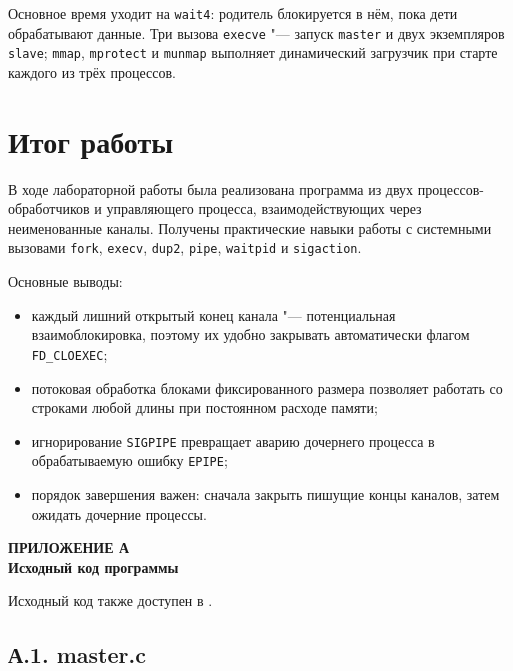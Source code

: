 \documentclass[12pt,a4paper]{article}
\begin{document}
Основное время уходит на \texttt{wait4}: родитель блокируется в нём, пока дети
обрабатывают данные. Три вызова \texttt{execve} "--- запуск \texttt{master} и
двух экземпляров \texttt{slave}; \texttt{mmap}, \texttt{mprotect} и
\texttt{munmap} выполняет динамический загрузчик при старте каждого из трёх
процессов.

\section{Итог работы}
В ходе лабораторной работы была реализована программа из двух
процессов-обработчиков и управляющего процесса, взаимодействующих через
неименованные каналы. Получены практические навыки работы с системными вызовами
\texttt{fork}, \texttt{execv}, \texttt{dup2}, \texttt{pipe}, \texttt{waitpid}
и \texttt{sigaction}.

Основные выводы:
\begin{itemize}
    \item каждый лишний открытый конец канала "--- потенциальная взаимоблокировка,
          поэтому их удобно закрывать автоматически флагом \texttt{FD\_CLOEXEC};
    \item потоковая обработка блоками фиксированного размера позволяет работать
          со строками любой длины при постоянном расходе памяти;
    \item игнорирование \texttt{SIGPIPE} превращает аварию дочернего процесса в
          обрабатываемую ошибку \texttt{EPIPE};
    \item порядок завершения важен: сначала закрыть пишущие концы каналов, затем
          ожидать дочерние процессы.
\end{itemize}

\newpage
{}
{}
\begin{center}
    {\large\bfseries ПРИЛОЖЕНИЕ А}\\[0.2cm]
    {\bfseries Исходный код программы}
\end{center}

Исходный код также доступен в
.

{}
\subsection*{А.1. master.c}

\end{document}
